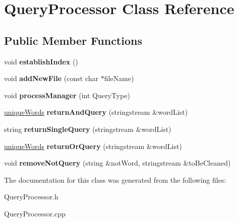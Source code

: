 \hypertarget{class_query_processor}{\section{Query\+Processor Class Reference}
\label{class_query_processor}
}
\subsection*{Public Member Functions}
\begin{DoxyCompactItemize}
\item 
\hypertarget{class_query_processor_a03dd195b55e8e1ac8feebc6021459f88}{void {\bfseries establish\+Index} ()}\label{class_query_processor_a03dd195b55e8e1ac8feebc6021459f88}

\item 
\hypertarget{class_query_processor_a42b22f3d69b6fefa6dd69c2caa03144a}{void {\bfseries add\+New\+File} (const char $\ast$file\+Name)}\label{class_query_processor_a42b22f3d69b6fefa6dd69c2caa03144a}

\item 
\hypertarget{class_query_processor_a0aeeb78c270fd6b8f5c807c7c0022aed}{void {\bfseries process\+Manager} (int Query\+Type)}\label{class_query_processor_a0aeeb78c270fd6b8f5c807c7c0022aed}

\item 
\hypertarget{class_query_processor_a2f136e04a7198ef8455d8c3414d998e1}{\hyperlink{classunique_words}{unique\+Words} {\bfseries return\+And\+Query} (stringstream \&word\+List)}\label{class_query_processor_a2f136e04a7198ef8455d8c3414d998e1}

\item 
\hypertarget{class_query_processor_a4d265cc7dc3575330a965bd4ad41f016}{string {\bfseries return\+Single\+Query} (stringstream \&word\+List)}\label{class_query_processor_a4d265cc7dc3575330a965bd4ad41f016}

\item 
\hypertarget{class_query_processor_ac35ae179a5233776914c25a28738777f}{\hyperlink{classunique_words}{unique\+Words} {\bfseries return\+Or\+Query} (stringstream \&word\+List)}\label{class_query_processor_ac35ae179a5233776914c25a28738777f}

\item 
\hypertarget{class_query_processor_ac1231d6dc8be7ecf1855c1501f006e64}{void {\bfseries remove\+Not\+Query} (string \&not\+Word, stringstream \&to\+Be\+Cleaned)}\label{class_query_processor_ac1231d6dc8be7ecf1855c1501f006e64}

\end{DoxyCompactItemize}


The documentation for this class was generated from the following files\+:\begin{DoxyCompactItemize}
\item 
Query\+Processor.\+h\item 
Query\+Processor.\+cpp\end{DoxyCompactItemize}
